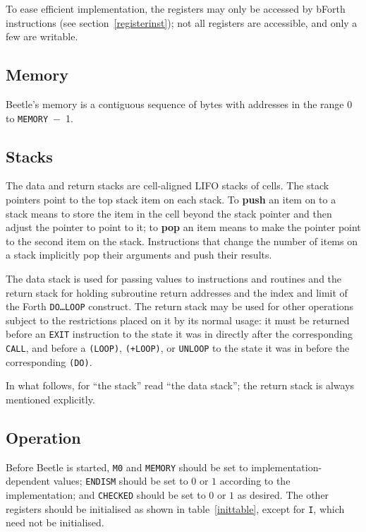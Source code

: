 \documentclass{article}
\begin{document}
To ease efficient implementation, the registers may only be accessed
by bForth instructions (see section~\ref{registerinst}); not all registers are accessible, and only a few are writable.


\subsection{Memory}

Beetle's memory is a contiguous sequence of bytes with addresses in the range $0$ to {\tt MEMORY}~$-$~1.

\subsection{Stacks}

The data and return stacks are cell-aligned LIFO stacks of cells. The stack
pointers point to the top stack item on each stack. To {\bf push} an item on to
a stack means to store the item in the cell beyond the stack pointer and then
adjust the pointer to point to it; to {\bf pop} an item means to make the
pointer point to the second item on the stack. Instructions that change the number of items on a
stack implicitly pop their arguments and push their results.

The data stack is used for passing values to instructions and routines and the
return stack for holding subroutine return addresses and the index and limit of
the Forth {\tt DO\dots LOOP} construct. The return stack may be used for other
operations subject to the restrictions placed on it by its normal usage: it must
be returned before an {\tt EXIT} instruction to the state it was in directly
after the corresponding {\tt CALL}, and before a {\tt (LOOP)}, {\tt (+LOOP)}, or
{\tt UNLOOP} to the state it was in before the corresponding {\tt (DO)}.

In what follows, for ``the stack'' read ``the data stack''; the return stack is
always mentioned explicitly.


\subsection{Operation}
\label{operation}

Before Beetle is started, {\tt M0} and {\tt MEMORY} should be set to implementation-dependent values; {\tt ENDISM} should be set to $0$ or $1$ according to the implementation; and {\tt CHECKED} should be set to $0$ or $1$ as desired. The other registers should be initialised as shown in table~\ref{inittable}, except for {\tt I}, which need not be initialised.
\end{document}

